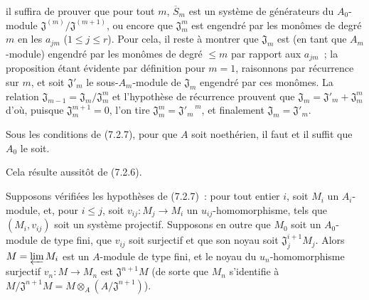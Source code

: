
il suffira de prouver que pour tout $m$, $\overline S_m$ est un système de
générateurs du $A_0$-module
$\mathfrak J^{(m)}/\mathfrak J^{(m+1)}$, ou encore que $\mathfrak J_m^m$ est
engendré par les monômes de degré $m$ en les $a_{jm}$ ($1\leq j\leq r$).
Pour cela, il reste à montrer que $\mathfrak J_m$ est (en tant que
$A_m$-module) engendré par les monômes de degré $\leq m$ par rapport aux
$a_{jm}$~; la proposition étant évidente par définition pour $m=1$,
raisonnons par récurrence sur $m$, et soit $\mathfrak J'_m$ le sous-$A_m$-module
de $\mathfrak J_m$ engendré par ces monômes. La relation
$\mathfrak J_{m-1}=\mathfrak J_m/\mathfrak J_m^m$ et l'hypothèse de récurrence
prouvent que $\mathfrak J_m=\mathfrak J'_m+\mathfrak J_m^m$ d'où, puisque
$\mathfrak J_m^{m+1}=0$, l'on tire
$\mathfrak J_m^m={\mathfrak J'_m}^{\,m}$, et finalement
$\mathfrak J_m=\mathfrak J'_m$.

\begin{corollary}[7.2.8]
\label{0.7.2.8-fr}
Sous les conditions de (7.2.7), pour que $A$ soit noethérien, il faut et il
suffit que $A_0$ le soit.
\end{corollary}

Cela résulte aussitôt de (7.2.6).

\begin{proposition}[7.2.9]
\label{0.7.2.9-fr}
Supposons vérifiées les hypothèses de (7.2.7)~: pour tout entier $i$, soit
$M_i$ un $A_i$-module, et, pour $i\leq j$, soit
$v_{ij}:M_j\to M_i$ un $u_{ij}$-homomorphisme, tels que $(M_i,v_{ij})$ soit un
système projectif. Supposons en outre que $M_0$ soit un $A_0$-module de type
fini, que $v_{ij}$ soit surjectif et que son noyau soit
$\mathfrak J_j^{i+1}M_j$. Alors $M=\varprojlim M_i$ est un $A$-module de type
fini, et le noyau du $u_n$-homomorphisme surjectif $v_n:M\to M_n$ est
$\mathfrak J^{n+1}M$ (de sorte que $M_n$ s'identifie à
$M/\mathfrak J^{n+1}M=M\otimes_A(A/\mathfrak J^{n+1})$).
\end{proposition}

